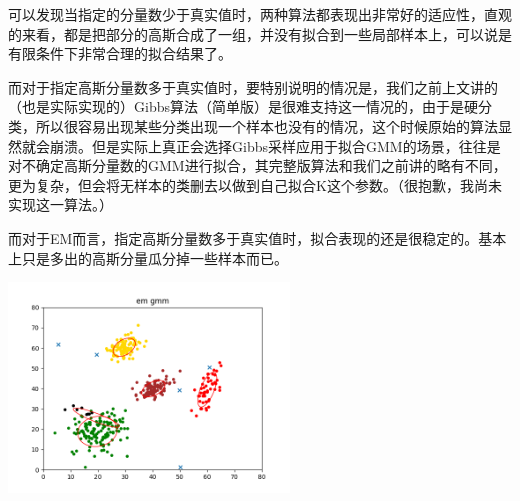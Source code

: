 \documentclass[hyperref,UTF8]{ctexart}
\begin{document}
\par 可以发现当指定的分量数少于真实值时，两种算法都表现出非常好的适应性，直观的来看，都是把部分的高斯合成了一组，并没有拟合到一些局部样本上，可以说是有限条件下非常合理的拟合结果了。
\par 而对于指定高斯分量数多于真实值时，要特别说明的情况是，我们之前上文讲的（也是实际实现的）Gibbs算法（简单版）是很难支持这一情况的，由于是硬分类，所以很容易出现某些分类出现一个样本也没有的情况，这个时候原始的算法显然就会崩溃。但是实际上真正会选择Gibbs采样应用于拟合GMM的场景，往往是对不确定高斯分量数的GMM进行拟合，其完整版算法和我们之前讲的略有不同，更为复杂，但会将无样本的类删去以做到自己拟合K这个参数。（很抱歉，我尚未实现这一算法。）
\par 而对于EM而言，指定高斯分量数多于真实值时，拟合表现的还是很稳定的。基本上只是多出的高斯分量瓜分掉一些样本而已。\\
\centerline{\includegraphics[height=2.2in]{exp-results/EM-5K.png}}
\end{document}
